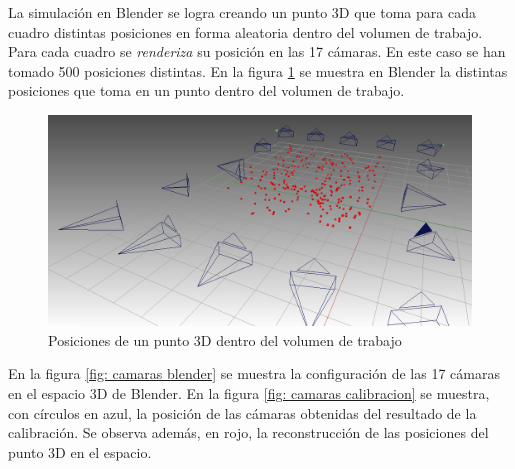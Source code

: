 La simulación en Blender se logra creando un punto 3D que toma para cada cuadro distintas posiciones en forma aleatoria dentro del volumen de trabajo. Para cada cuadro se \textit{renderiza} su posición en las 17 cámaras. En este caso se han tomado 500 posiciones distintas. En la figura \ref{fig: blender toolbox laser} se muestra en Blender la distintas posiciones que toma en un punto dentro del volumen de trabajo.

\begin{figure}[ht!]
\begin{center}
\includegraphics[scale=0.22]{img/calibracion/blender_toolbox_laser.png}
\end{center}
\caption{Posiciones de un punto 3D dentro del volumen de trabajo}
\label{fig: blender toolbox laser}
\end{figure}

En la figura \ref{fig: camaras blender} se muestra la configuración de las 17 cámaras en el espacio 3D de Blender. En la figura \ref{fig: camaras calibracion} se muestra, con círculos en azul, la posición de las cámaras obtenidas del resultado de la calibración. Se observa además, en rojo, la reconstrucción de las posiciones del punto 3D en el espacio.


